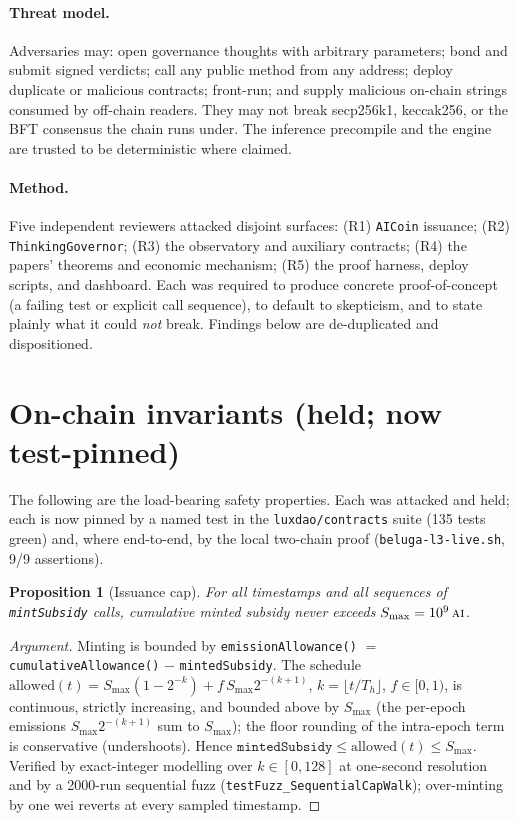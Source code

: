 \documentclass[11pt]{article}
\newtheorem{proposition}[theorem]{Proposition}
\begin{document}
\paragraph{Threat model.} Adversaries may: open governance thoughts with
arbitrary parameters; bond and submit signed verdicts; call any public method
from any address; deploy duplicate or malicious contracts; front-run; and supply
malicious on-chain strings consumed by off-chain readers. They may not break
secp256k1, keccak256, or the BFT consensus the chain runs under. The
inference precompile and the engine are trusted to be deterministic where claimed.

\paragraph{Method.} Five independent reviewers attacked disjoint surfaces:
(R1) \texttt{AICoin} issuance; (R2) \texttt{ThinkingGovernor}; (R3) the
observatory and auxiliary contracts; (R4) the papers' theorems and economic
mechanism; (R5) the proof harness, deploy scripts, and dashboard. Each was
required to produce concrete proof-of-concept (a failing test or explicit call
sequence), to default to skepticism, and to state plainly what it could
\emph{not} break. Findings below are de-duplicated and dispositioned.

\section{On-chain invariants (held; now test-pinned)}

The following are the load-bearing safety properties. Each was attacked and held;
each is now pinned by a named test in the \texttt{luxdao/contracts} suite
(135 tests green) and, where end-to-end, by the local two-chain proof
(\texttt{beluga-l3-live.sh}, 9/9 assertions).

\begin{proposition}[Issuance cap]
For all timestamps and all sequences of \texttt{mintSubsidy} calls, cumulative
minted subsidy never exceeds $S_{\max}=10^{9}\,\textsc{ai}$.
\end{proposition}
\begin{proof}[Argument]
Minting is bounded by \texttt{emissionAllowance()} $=$
\texttt{cumulativeAllowance()} $-$ \texttt{mintedSubsidy}. The schedule
$\mathrm{allowed}(t)=S_{\max}\!\left(1-2^{-k}\right)+f\,S_{\max}2^{-(k+1)}$,
$k=\lfloor t/T_h\rfloor$, $f\in[0,1)$, is continuous, strictly increasing, and
bounded above by $S_{\max}$ (the per-epoch emissions $S_{\max}2^{-(k+1)}$ sum to
$S_{\max}$); the floor rounding of the intra-epoch term is conservative
(undershoots). Hence $\texttt{mintedSubsidy}\le\mathrm{allowed}(t)\le S_{\max}$.
Verified by exact-integer modelling over $k\in[0,128]$ at one-second resolution
and by a 2000-run sequential fuzz (\texttt{testFuzz\_SequentialCapWalk});
over-minting by one wei reverts at every sampled timestamp.
\end{proof}
\end{document}
